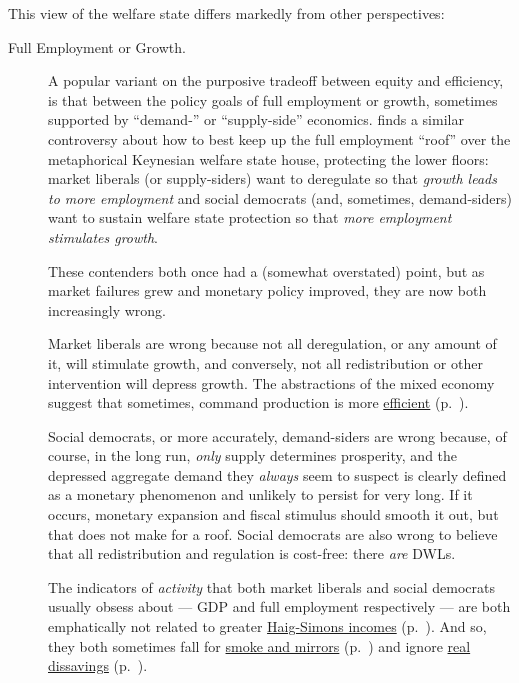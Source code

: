 This view of the welfare state differs markedly from other perspectives:
\begin{description}
	\item[Full Employment or Growth.] A popular variant on the purposive tradeoff between equity and efficiency, is that between the policy goals of full employment or growth, sometimes supported by ``demand-'' or ``supply-side'' economics. %
	\citeauthor{Offe2003} \citeyearpar[453]{Offe2003} finds a similar controversy about how to best keep up the full employment ``roof'' over the metaphorical Keynesian welfare state house, protecting the lower floors: market liberals (or supply-siders) want to deregulate so that \emph{growth leads to more employment} and social democrats (and, sometimes, demand-siders) want to sustain welfare state protection so that \emph{more employment stimulates growth}. 
	
	These contenders both once had a (somewhat overstated) point, but as market failures grew and monetary policy improved, they are now both increasingly wrong. 
	
	Market liberals are wrong because not all deregulation, or any amount of it, will stimulate growth, and conversely, not all redistribution or other intervention will depress growth. The abstractions of the mixed economy suggest that sometimes, command production is more \hyperref[sec:market-failures]{efficient} (p.~\pageref{sec:market-failures}).
	
	Social democrats, or more accurately, demand-siders are wrong because, of course, in the long run, \emph{only} supply determines prosperity, and the depressed aggregate demand they \emph{always} seem to suspect is clearly defined as a monetary phenomenon and unlikely to persist for very long. If it occurs, monetary expansion and fiscal stimulus should smooth it out, but that does not make for a roof. Social democrats are also wrong to believe that all redistribution and regulation is cost-free: there \emph{are} \glspl{DWL}. 
	
	The indicators of \emph{activity} that both market liberals and social democrats usually obsess about --- \gls{GDP} and full employment respectively --- are both emphatically not related to greater \hyperref[sec:tradeoffs]{Haig-Simons incomes} (p.~\pageref{sec:tradeoffs}). And so, they both sometimes fall for \hyperref[sec:smoke-n-mirrors]{smoke and mirrors} (p.~\pageref{sec:smoke-n-mirrors}) and ignore \hyperref[sec:realdissavings]{real dissavings} (p.~\pageref{sec:realdissavings}). %
	

\end{description}
